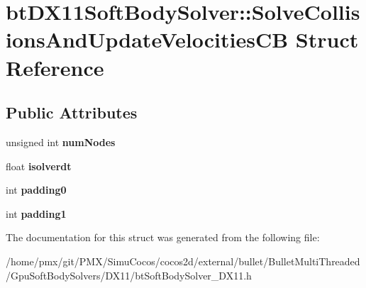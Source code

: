 \hypertarget{structbtDX11SoftBodySolver_1_1SolveCollisionsAndUpdateVelocitiesCB}{}\section{bt\+D\+X11\+Soft\+Body\+Solver\+:\+:Solve\+Collisions\+And\+Update\+Velocities\+CB Struct Reference}
\label{structbtDX11SoftBodySolver_1_1SolveCollisionsAndUpdateVelocitiesCB}
\subsection*{Public Attributes}
\begin{DoxyCompactItemize}
\item 
\mbox{\label{structbtDX11SoftBodySolver_1_1SolveCollisionsAndUpdateVelocitiesCB_a9f5cdac77c71cbe818b0966667e0a567}} 
unsigned int {\bfseries num\+Nodes}
\item 
\mbox{\label{structbtDX11SoftBodySolver_1_1SolveCollisionsAndUpdateVelocitiesCB_abc75bf04f4ae4df1846cc6e3bf318d8b}} 
float {\bfseries isolverdt}
\item 
\mbox{\label{structbtDX11SoftBodySolver_1_1SolveCollisionsAndUpdateVelocitiesCB_aad340c9796c6941a15235a9466f2a365}} 
int {\bfseries padding0}
\item 
\mbox{\label{structbtDX11SoftBodySolver_1_1SolveCollisionsAndUpdateVelocitiesCB_a55af3d04e9baeb10ff1748eea6449378}} 
int {\bfseries padding1}
\end{DoxyCompactItemize}


The documentation for this struct was generated from the following file\+:\begin{DoxyCompactItemize}
\item 
/home/pmx/git/\+P\+M\+X/\+Simu\+Cocos/cocos2d/external/bullet/\+Bullet\+Multi\+Threaded/\+Gpu\+Soft\+Body\+Solvers/\+D\+X11/bt\+Soft\+Body\+Solver\+\_\+\+D\+X11.\+h\end{DoxyCompactItemize}
